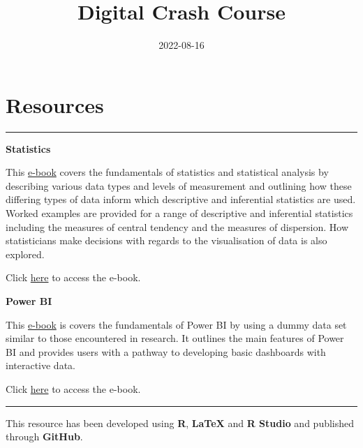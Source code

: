 \documentclass[
]{book}
\title{Digital Crash Course}
\author{}
\date{\vspace{-2.5em}2022-08-16}
\begin{document}
\maketitle

{
\setcounter{tocdepth}{1}
\tableofcontents
}
\hypertarget{Resources}{%
\chapter*{Resources}\label{Resources}}

\begin{center}\rule{0.5\linewidth}{0.5pt}\end{center}

\textbf{Statistics}

This \href{https://aamcmurray.github.io/Statistics/}{e-book} covers the fundamentals of statistics and statistical analysis by describing various data types and levels of measurement and outlining how these differing types of data inform which descriptive and inferential statistics are used. Worked examples are provided for a range of descriptive and inferential statistics including the measures of central tendency and the measures of dispersion. How statisticians make decisions with regards to the visualisation of data is also explored.

Click \href{https://aamcmurray.github.io/Statistics/}{here} to access the e-book.

\textbf{Power BI}

This \href{https://aamcmurray.github.io/Power-BI/}{e-book} is covers the fundamentals of Power BI by using a dummy data set similar to those encountered in research. It outlines the main features of Power BI and provides users with a pathway to developing basic dashboards with interactive data.

Click \href{https://aamcmurray.github.io/Power-BI/}{here} to access the e-book.

\begin{center}\rule{0.5\linewidth}{0.5pt}\end{center}

This resource has been developed using \textbf{R}, \textbf{LaTeX} and \textbf{R Studio} and published through \textbf{GitHub}.

  
\end{document}
